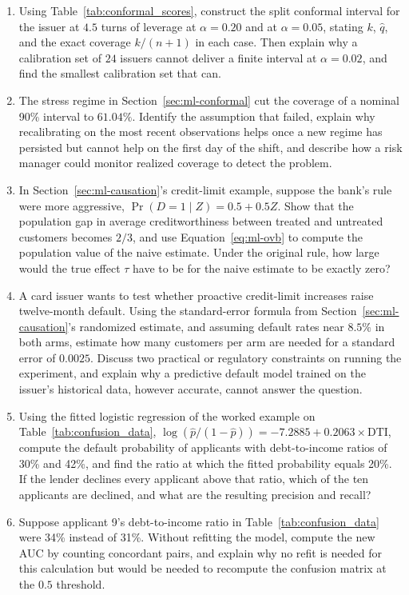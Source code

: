 \documentclass[../ai_in_finance]{subfiles}
\begin{document}
\begin{enumerate}[exercises]
    \item Using Table~\ref{tab:conformal_scores}, construct the split conformal interval for the issuer at $4.5$ turns of leverage at $\alpha = 0.20$ and at $\alpha = 0.05$, stating $k$, $\hat q$, and the exact coverage $k/(n+1)$ in each case. Then explain why a calibration set of $24$ issuers cannot deliver a finite interval at $\alpha = 0.02$, and find the smallest calibration set that can.
    \item The stress regime in Section~\ref{sec:ml-conformal} cut the coverage of a nominal 90\% interval to $61.04\%$. Identify the assumption that failed, explain why recalibrating on the most recent observations helps once a new regime has persisted but cannot help on the first day of the shift, and describe how a risk manager could monitor realized coverage to detect the problem.
    \item In Section~\ref{sec:ml-causation}'s credit-limit example, suppose the bank's rule were more aggressive, $\Pr(D=1 \mid Z) = 0.5 + 0.5Z$. Show that the population gap in average creditworthiness between treated and untreated customers becomes $2/3$, and use Equation~\eqref{eq:ml-ovb} to compute the population value of the naive estimate. Under the original rule, how large would the true effect $\tau$ have to be for the naive estimate to be exactly zero?
    \item A card issuer wants to test whether proactive credit-limit increases raise twelve-month default. Using the standard-error formula from Section~\ref{sec:ml-causation}'s randomized estimate, and assuming default rates near $8.5\%$ in both arms, estimate how many customers per arm are needed for a standard error of $0.0025$. Discuss two practical or regulatory constraints on running the experiment, and explain why a predictive default model trained on the issuer's historical data, however accurate, cannot answer the question.
    \item Using the fitted logistic regression of the worked example on Table~\ref{tab:confusion_data}, $\log(\hat p/(1-\hat p)) = -7.2885 + 0.2063 \times \text{DTI}$, compute the default probability of applicants with debt-to-income ratios of 30\% and 42\%, and find the ratio at which the fitted probability equals 20\%. If the lender declines every applicant above that ratio, which of the ten applicants are declined, and what are the resulting precision and recall?
    \item Suppose applicant 9's debt-to-income ratio in Table~\ref{tab:confusion_data} were 34\% instead of 31\%. Without refitting the model, compute the new AUC by counting concordant pairs, and explain why no refit is needed for this calculation but would be needed to recompute the confusion matrix at the $0.5$ threshold.

\end{enumerate}
\end{document}

